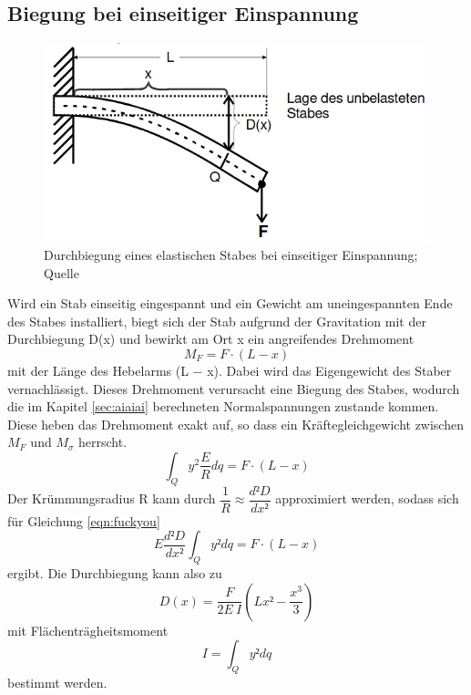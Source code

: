 \subsection{Biegung bei einseitiger Einspannung}
    \begin{figure}
        \centering
        \includegraphics[scale=0.5]{Lebertransuppe.png}
        \caption{Durchbiegung eines elastischen Stabes bei einseitiger Einspannung; Quelle \cite{sample}}
        \label{fig:lebertran}
    \end{figure}
    Wird ein Stab einseitig eingespannt und ein Gewicht am uneingespannten Ende des Stabes 
    installiert, biegt sich der Stab aufgrund der Gravitation mit der Durchbiegung D(x) 
    und bewirkt am Ort x ein angreifendes Drehmoment
    \begin{equation}
        M_F = F \cdot (L − x)
    \end{equation}
    mit der Länge des Hebelarms (L − x). Dabei wird das Eigengewicht des Staber vernachlässigt.
    Dieses Drehmoment verursacht eine Biegung des Stabes, wodurch die im Kapitel 
    \ref{sec:aiaiai} berechneten Normalspannungen zustande kommen. Diese heben das 
    Drehmoment exakt auf, so dass ein Kräftegleichgewicht zwischen $M_F$ und $M_{\sigma}$ herrscht.
    \begin{equation}
        \int_Q y^2 \dfrac{E}{R}dq  = F \cdot (L − x)
    \end{equation}
    Der Krümmungsradius R kann durch $\dfrac{1}{R} \approx 
    \dfrac{d²D}{dx²}$ approximiert werden, sodass sich für Gleichung \ref{eqn:fuckyou}
    \begin{equation}
        E \dfrac{d²D}{dx²} \int_Q y² dq=F\cdot(L-x)
    \end{equation}
    ergibt. Die Durchbiegung kann also zu
    \begin{equation}
        D(x)=\dfrac{F}{2 E \ I}(Lx²-\dfrac{x^3}{3})
        \label{eqn:hubert}
    \end{equation}
    mit Flächenträgheitsmoment
    \begin{equation}
        I = \int_Q y² dq
        \label{eqn:trage}
    \end{equation}
    bestimmt werden.

